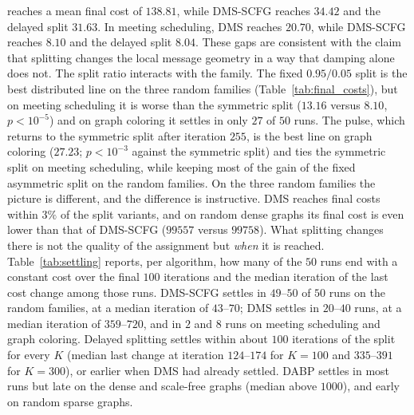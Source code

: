 reaches a mean final cost of $138.81$, while DMS-SCFG reaches $34.42$ and
the delayed split $31.63$.  In meeting scheduling, DMS reaches $20.70$,
while DMS-SCFG reaches $8.10$ and the delayed split $8.04$.  These gaps are
consistent with the claim that splitting changes the local message
geometry in a way that damping alone does not.
The split ratio interacts with the family.  The fixed $0.95/0.05$ split is
the best distributed line on the three random families (Table~\ref{tab:final_costs}),
but on meeting scheduling it is worse than the symmetric split ($13.16$
versus $8.10$, $p < 10^{-5}$) and on graph coloring it settles in only
$27$ of $50$ runs.  The pulse, which returns to the symmetric split after
iteration $255$, is the best line on graph coloring ($27.23$; $p < 10^{-3}$
against the symmetric split) and ties the symmetric split on meeting
scheduling, while keeping most of the gain of the fixed asymmetric split on
the random families.
On the three random families the picture is different, and the difference
is instructive.  DMS reaches final costs within $3\%$ of the split
variants, and on random dense graphs its final cost is even lower than
that of DMS-SCFG ($99557$ versus $99758$).  What splitting changes there is
not the quality of the assignment but \emph{when} it is reached.
Table~\ref{tab:settling} reports, per algorithm, how many of the $50$ runs
end with a constant cost over the final $100$ iterations and the median
iteration of the last cost change among those runs.  DMS-SCFG settles in
$49$--$50$ of $50$ runs on the random families, at a median iteration of
$43$--$70$; DMS settles in $20$--$40$ runs, at a median iteration of
$359$--$720$, and in $2$ and $8$ runs on meeting scheduling and graph
coloring.  Delayed splitting settles within about $100$ iterations of the split for
every $K$ (median last change at iteration $124$--$174$ for $K=100$ and
$335$--$391$ for $K=300$), or earlier when DMS had already settled.  DABP settles in most runs but late on the dense
and scale-free graphs (median above $1000$), and early on random sparse
graphs.
